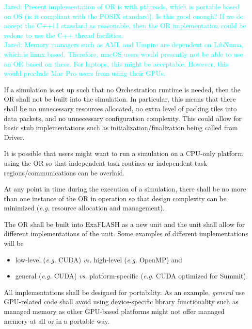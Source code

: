 \documentclass{article}
\newcommand{\FlashOfTheFuture}{ExaFLASH\xspace}
\newcommand{\Jared}[1]          {\textcolor{cyan}{Jared: #1}}
\newcommand{\shortOR}   {OR\xspace}
\newcommand{\OR}        {\shortOR}
\newcommand{\taskroutines}       {task routines\xspace}
\begin{document}
\Jared{Present implementation of \OR is with pthreads, which is
portable based on OS (is it compliant with the POSIX standard).  Is this good
enough?  If we do accept the C++11 standard as reasonable, then the \OR
implementation could be redone to use the C++ thread facilities.}\\

\Jared{Memory managers such as AML and Umpire are dependent on
LibNuma, which is linux based.  Therefore, macOS users would presently not be
able to use an \OR based on these.  For laptops, this might be acceptable.
However, this would preclude Mac Pro users from using their GPUs.}

\begin{req}
If a simulation is set up such that no Orchestration runtime is needed, then the
\OR shall not be built into the simulation.  In particular, this means that
there shall be no unnecessary resources allocated, no extra level of packing
tiles into data packets, and no unnecessary configuration complexity.  This
could allow for basic stub implementations such as initialization/finalization
being called from Driver.
\end{req}

It is possible that users might want to run a simulation on a CPU-only platform
using the \OR so that independent \taskroutines or independent task regions/communications
can be overlaid.

\begin{req}
At any point in time during the execution of a simulation, there shall be no more
than one instance of the \OR in operation so that design complexity can
be minimized (\textit{e.g.} resource allocation and management).
\end{req}

\begin{req}
\label{req:UnitImplementations}
The \OR shall be built into \FlashOfTheFuture as a new unit and the unit shall allow
for different implementations of the unit.  Some examples of different
implementations will be
\begin{itemize}
\item{low-level (\textit{e.g.} CUDA) \textit{vs.} high-level
(\textit{e.g.} OpenMP) and}
\item{general (\textit{e.g.} CUDA) \textit{vs.}} platform-specific
(\textit{e.g.} CUDA optimized for Summit).
\end{itemize}
\end{req}

\begin{req}
\label{req:Portability}
All implementations shall be designed for portability.  As an example,
\textit{general} use GPU-related code shall avoid using device-specific library
functionality such as managed memory as other GPU-based platforms might not
offer managed memory at all or in a portable way.
\end{req}
\end{document}

